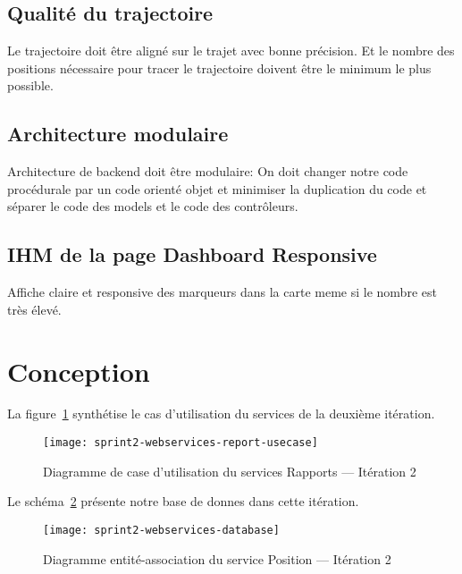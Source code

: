 \subsection{Qualité du trajectoire}

Le trajectoire doit être aligné sur le trajet avec bonne précision. Et le
nombre des positions nécessaire pour tracer le trajectoire doivent être le
minimum le plus possible.

\subsection{Architecture modulaire}

Architecture de backend doit être modulaire: On doit changer notre code
procédurale par un code orienté objet et minimiser la duplication du code et
séparer le code des models et le code des contrôleurs.

\subsection{IHM de la page Dashboard Responsive}

Affiche claire et responsive des marqueurs dans la carte meme si le nombre est
très élevé.

\section{Conception}

La figure~\ref{fig:sprint2-webservices-report-usecase} synthétise le cas
d'utilisation du services  de la deuxième itération.

\begin{figure}[htbp]
    \centering
    \texttt{[image: sprint2-webservices-report-usecase]}
    \caption{Diagramme de case d'utilisation du services Rapports --- Itération 2}
\label{fig:sprint2-webservices-report-usecase}
\end{figure}

Le schéma~\ref{fig:sprint2-webservices-database} présente notre base de donnes
dans cette itération.

\begin{figure}[htbp]
    \centering
    \texttt{[image: sprint2-webservices-database]}
    \caption{Diagramme entité-association du service Position --- Itération 2}
\label{fig:sprint2-webservices-database}
\end{figure}

